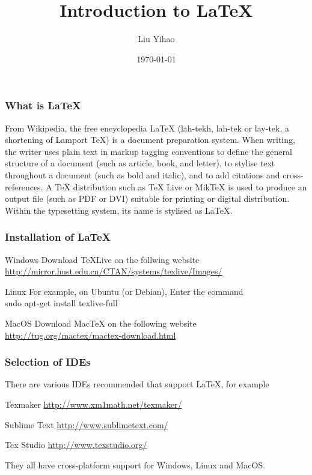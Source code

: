 \documentclass{beamer}
\title{Introduction to \LaTeX}
\author{Liu Yihao}
\date{\today}
\begin{document}
\begin{frame}
	\titlepage	
\end{frame}

\begin{frame}
	\frametitle{What is \LaTeX}
	\begin{block}{From Wikipedia, the free encyclopedia}
		LaTeX (lah-tekh, lah-tek or lay-tek, a shortening of Lamport TeX) is a document preparation system. When writing, the writer uses plain text in markup tagging conventions to define the general structure of a document (such as article, book, and letter), to stylise text throughout a document (such as bold and italic), and to add citations and cross-references. A TeX distribution such as TeX Live or MikTeX is used to produce an output file (such as PDF or DVI) suitable for printing or digital distribution. Within the typesetting system, its name is stylised as \LaTeX.
	\end{block}
\end{frame}

\begin{frame}
	\frametitle{Installation of \LaTeX}
	\begin{block}{Windows}
		Download TeXLive on the follwing website\\
		\href{http://mirror.hust.edu.cn/CTAN/systems/texlive/Images/}{\color{blue}http://mirror.hust.edu.cn/CTAN/systems/texlive/Images/}
	\end{block}
	\begin{block}{Linux}
		For example, on Ubuntu (or Debian), Enter the command\\
		{\color{red}sudo apt-get install texlive-full}
	\end{block}
	\begin{block}{MacOS}
		Download MacTeX on the following website\\
		\href{http://tug.org/mactex/mactex-download.html}
		{\color{blue}http://tug.org/mactex/mactex-download.html}
	\end{block}
\end{frame}

\begin{frame}
	\frametitle{Selection of IDEs}
	There are various IDEs recommended that support \LaTeX , for example\\
	\begin{block}{Texmaker}
		\href{http://www.xm1math.net/texmaker/}{\color{blue}http://www.xm1math.net/texmaker/}
	\end{block}
	\begin{block}{Sublime Text}
		\href{http://www.sublimetext.com/}{\color{blue}http://www.sublimetext.com/}
	\end{block}
	\begin{block}{Tex Studio}
		\href{http://www.texstudio.org/}{\color{blue}http://www.texstudio.org/}
	\end{block}
	They all have cross-platform support for Windows, Linux and MacOS.
\end{frame}
\end{document}
